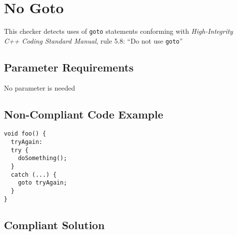%
%

\section{No Goto}
\label{NoGoto::overview}

   This checker detects uses of \texttt{goto} statements conforming
with \textit{High-Integrity C++ Coding Standard Manual}, rule 5.8:
``Do not use \texttt{goto}''

\subsection{Parameter Requirements}

   No parameter is needed

\subsection{Non-Compliant Code Example}


\begin{verbatim}
void foo() {
  tryAgain:
  try {
    doSomething();
  }
  catch (...) {
    goto tryAgain;
  }
}
\end{verbatim}

\subsection{Compliant Solution}

